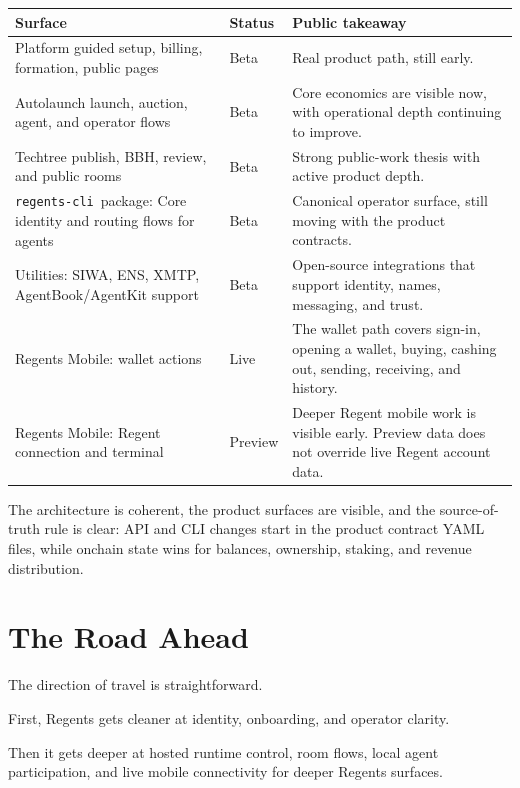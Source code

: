 \documentclass[11pt]{article}
\newcommand{\cliname}{\texttt{regents-cli}}
\begin{document}
\begin{table}[htbp]
\small
\centering
\begin{tabularx}{\textwidth}{>{\raggedright\arraybackslash}p{} >{\raggedright\arraybackslash}p{} X}
\toprule
\textbf{Surface} & \textbf{Status} & \textbf{Public takeaway} \\
\midrule
Platform guided setup, billing, formation, public pages & Beta & Real product path, still early. \\
Autolaunch launch, auction, agent, and operator flows & Beta & Core economics are visible now, with operational depth continuing to improve. \\
Techtree publish, BBH, review, and public rooms & Beta & Strong public-work thesis with active product depth. \\
\cliname\ package: Core identity and routing flows for agents & Beta & Canonical operator surface, still moving with the product contracts. \\
Utilities: SIWA, ENS, XMTP, AgentBook/AgentKit support & Beta & Open-source integrations that support identity, names, messaging, and trust. \\
Regents Mobile: wallet actions & Live & The wallet path covers sign-in, opening a wallet, buying, cashing out, sending, receiving, and history. \\
Regents Mobile: Regent connection and terminal & Preview & Deeper Regent mobile work is visible early. Preview data does not override live Regent account data. \\
\bottomrule
\end{tabularx}
\end{table}

The architecture is coherent, the product surfaces are visible, and the source-of-truth rule is clear: API and CLI changes start in the product contract YAML files, while onchain state wins for balances, ownership, staking, and revenue distribution.

\section{The Road Ahead}

The direction of travel is straightforward.

First, Regents gets cleaner at identity, onboarding, and operator clarity.

Then it gets deeper at hosted runtime control, room flows, local agent participation, and live mobile connectivity for deeper Regents surfaces.
\end{document}
